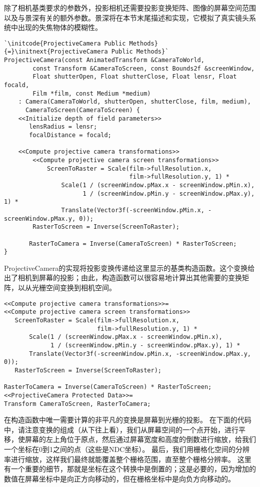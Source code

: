 除了相机基类要求的参数外，投影相机还需要投影变换矩阵、图像的屏幕空间范围以及与景深有关的额外参数。景深将在本节末尾描述和实现，它模拟了真实镜头系统中出现的失焦物体的模糊性。
\begin{lstlisting}
`\initcode{ProjectiveCamera Public Methods}{=}\initnext{ProjectiveCamera Public Methods}`
ProjectiveCamera(const AnimatedTransform &CameraToWorld, 
        const Transform &CameraToScreen, const Bounds2f &screenWindow,
        Float shutterOpen, Float shutterClose, Float lensr, Float focald,
        Film *film, const Medium *medium)
    : Camera(CameraToWorld, shutterOpen, shutterClose, film, medium),
      CameraToScreen(CameraToScreen) {
    <<Initialize depth of field parameters>> 
       lensRadius = lensr;
       focalDistance = focald;

    <<Compute projective camera transformations>> 
        <<Compute projective camera screen transformations>> 
            ScreenToRaster = Scale(film->fullResolution.x, 
                                   film->fullResolution.y, 1) *
                Scale(1 / (screenWindow.pMax.x - screenWindow.pMin.x),
                      1 / (screenWindow.pMin.y - screenWindow.pMax.y), 1) *
                Translate(Vector3f(-screenWindow.pMin.x, -screenWindow.pMax.y, 0));
        RasterToScreen = Inverse(ScreenToRaster);

       RasterToCamera = Inverse(CameraToScreen) * RasterToScreen;
}
\end{lstlisting}

ProjectiveCamera的实现将投影变换传递给这里显示的基类构造函数。这个变换给出了相机到屏幕的投影；由此，构造函数可以很容易地计算出其他需要的变换矩阵，以从光栅空间变换到相机空间。

\begin{lstlisting}
<<Compute projective camera transformations>>= 
<<Compute projective camera screen transformations>> 
   ScreenToRaster = Scale(film->fullResolution.x, 
                          film->fullResolution.y, 1) *
       Scale(1 / (screenWindow.pMax.x - screenWindow.pMin.x),
             1 / (screenWindow.pMin.y - screenWindow.pMax.y), 1) *
       Translate(Vector3f(-screenWindow.pMin.x, -screenWindow.pMax.y, 0));
   RasterToScreen = Inverse(ScreenToRaster);

RasterToCamera = Inverse(CameraToScreen) * RasterToScreen;
<<ProjectiveCamera Protected Data>>= 
Transform CameraToScreen, RasterToCamera;
\end{lstlisting}

在构造函数中唯一需要计算的非平凡的变换是屏幕到光栅的投影。
在下面的代码中，请注意变换的组成（从下往上看），我们从屏幕空间的一个点开始，进行平移，使屏幕的左上角位于原点，然后通过屏幕宽度和高度的倒数进行缩放，给我们一个坐标在0到1之间的点（这些是NDC坐标）。
最后，我们用栅格化空间的分辨率进行缩放，这样我们最终就能覆盖整个栅格范围，直至整个栅格分辨率。
这里有一个重要的细节，那就是坐标在这个转换中是倒置的；这是必要的，因为增加的数值在屏幕坐标中是向正方向移动的，但在栅格坐标中是向负方向移动的。

